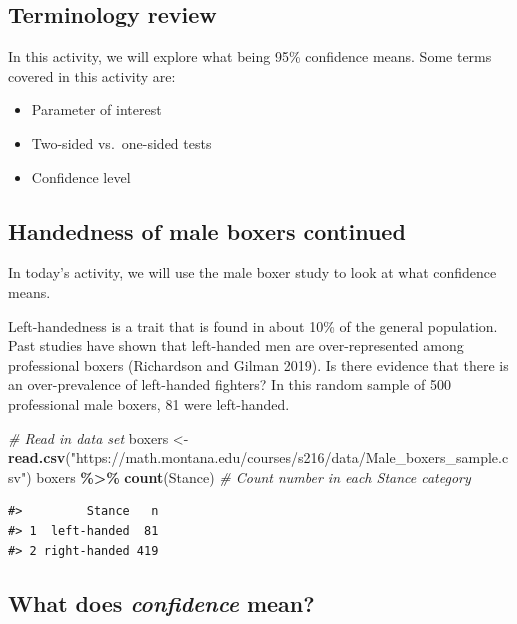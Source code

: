 \documentclass[
]{report}
\newenvironment{Shaded}{\begin{snugshade}}{\end{snugshade}}
\newcommand{\CommentTok}[1]{\textcolor[rgb]{0.56,0.35,0.01}{\textit{#1}}}
\newcommand{\FunctionTok}[1]{\textcolor[rgb]{0.13,0.29,0.53}{\textbf{#1}}}
\newcommand{\NormalTok}[1]{#1}
\newcommand{\OtherTok}[1]{\textcolor[rgb]{0.56,0.35,0.01}{#1}}
\newcommand{\SpecialCharTok}[1]{\textcolor[rgb]{0.81,0.36,0.00}{\textbf{#1}}}
\newcommand{\StringTok}[1]{\textcolor[rgb]{0.31,0.60,0.02}{#1}}
\begin{document}
\subsection{Terminology review}\label{terminology-review-6}

In this activity, we will explore what being 95\% confidence means. Some terms covered in this activity are:

\begin{itemize}
\item
  Parameter of interest
\item
  Two-sided vs.~one-sided tests
\item
  Confidence level
\end{itemize}

\subsection{Handedness of male boxers continued}\label{handedness-of-male-boxers-continued}

In today's activity, we will use the male boxer study to look at what confidence means.

Left-handedness is a trait that is found in about 10\% of the general population. Past studies have shown that left-handed men are over-represented among professional boxers (Richardson and Gilman 2019). Is there evidence that there is an over-prevalence of left-handed fighters? In this random sample of 500 professional male boxers, 81 were left-handed.

\begin{Shaded}
\begin{Highlighting}[]
 \CommentTok{\# Read in data set}
\NormalTok{boxers }\OtherTok{\textless{}{-}} \FunctionTok{read.csv}\NormalTok{(}\StringTok{"https://math.montana.edu/courses/s216/data/Male\_boxers\_sample.csv"}\NormalTok{)}
\NormalTok{boxers }\SpecialCharTok{\%\textgreater{}\%} \FunctionTok{count}\NormalTok{(Stance)  }\CommentTok{\# Count number in each Stance category}
\end{Highlighting}
\end{Shaded}

\begin{verbatim}
#>         Stance   n
#> 1  left-handed  81
#> 2 right-handed 419
\end{verbatim}

\subsection*{\texorpdfstring{What does \emph{confidence} mean?}{What does confidence mean?}}\label{what-does-confidence-mean}
\end{document}
